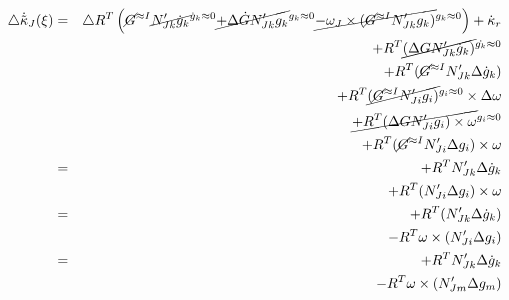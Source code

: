 \begin{eqnarray*}
\triangle\dot{\tilde{\kappa}}_{J}(\xi) & = & \triangle R^{T}\left(\cancel{G}^{\approx I}\cancel{N_{Jk}'\dot{g}_{k}}^{\dot{g}_{k}\approx0}\cancel{+\Delta\dot{G}N_{Jk}'g_{k}}^{g_{k}\approx0}\cancel{-\omega_{J}\times(\cancel{G}^{\approx I}N_{Jk}'g_{k})}^{g_{k}\approx0}\right)+\dot{\kappa}_{r}\\
 &  & +R^{T}\cancel{(\Delta GN_{Jk}'\dot{g}_{k})}^{\dot{g_{k}}\approx0}\\
 &  & +R^{T}(\cancel{G}^{\approx I}N_{Jk}'\Delta\dot{g}_{k})\\
 &  & +R^{T}\cancel{(\cancel{G}^{\approx I}N_{Ji}'g_{i})}^{g_{i}\approx0}\times\Delta\omega\\
 &  & \cancel{+R^{T}(\Delta GN_{Ji}'g_{i})\times\omega}^{g_{i}\approx0}\\
 &  & +R^{T}(\cancel{G}^{\approx I}N_{Ji}'\Delta g_{i})\times\omega\\
 & = & +R^{T}N_{Jk}'\Delta\dot{g}_{k}\\
 &  & +R^{T}(N_{Ji}'\Delta g_{i})\times\omega\\
 & = & +R^{T}(N_{Jk}'\Delta\dot{g}_{k})\\
 &  & -R^{T}\omega\times(N_{Ji}'\Delta g_{i})\\
 & = & +R^{T}N_{Jk}'\Delta\dot{g}_{k}\\
 &  & -R^{T}\omega\times(N_{Jm}'\Delta g_{m})
\end{eqnarray*}



